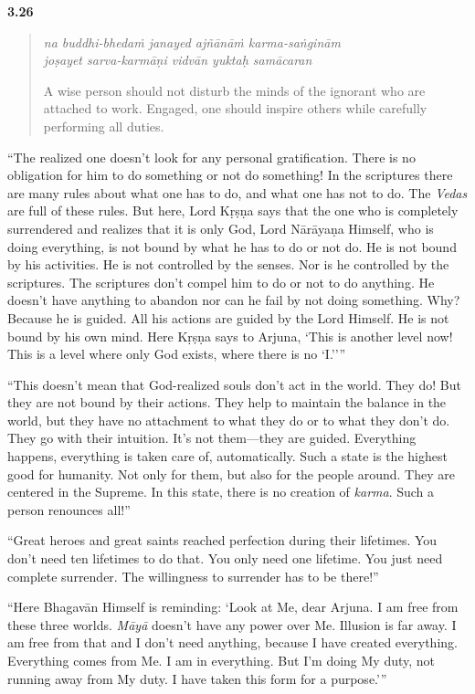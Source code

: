 \par\noindent\textbf{3.26}\par
\begin{verse}
\textit{na buddhi-bhedaṁ janayed ajñānāṁ karma-saṅginām} \\
\textit{joṣayet sarva-karmāṇi vidvān yuktaḥ samācaran}

\noindent A wise person should not disturb the minds of the ignorant who are attached to work. Engaged, one should inspire others while carefully performing all duties.
\end{verse}
\par


\enquote{The realized one doesn’t look for any personal gratification. There is no obligation for him to do something or not do something! In the scriptures there are many rules about what one has to do, and what one has not to do. The \textit{Vedas} are full of these rules. But here, Lord Kṛṣṇa says that the one who is completely surrendered and realizes that it is only God, Lord Nārāyaṇa Himself, who is doing everything, is not bound by what he has to do or not do. He is not bound by his activities. He is not controlled by the senses. Nor is he controlled by the scriptures. The scriptures don’t compel him to do or not to do anything. He doesn’t have anything to abandon nor can he fail by not doing something. Why? Because he is guided. All his actions are guided by the Lord Himself. He is not bound by his own mind. Here Kṛṣṇa says to Arjuna, \enquote{This is another level now! This is a level where only God exists, where there is no ‘I.’}}

\enquote{This doesn’t mean that God-realized souls don’t act in the world. They do! But they are not bound by their actions. They help to maintain the balance in the world, but they have no attachment to what they do or to what they don’t do. They go with their intuition. It’s not them---they are guided. Everything happens, everything is taken care of, automatically. Such a state is the highest good for humanity. Not only for them, but also for the people around. They are centered in the Supreme. In this state, there is no creation of \textit{karma}. Such a person renounces all!}


\enquote{Great heroes and great saints reached perfection during their lifetimes. You don’t need ten lifetimes to do that. You only need one lifetime. You just need complete surrender. The willingness to surrender has to be there!}

\enquote{Here Bhagavān Himself is reminding: \enquote{Look at Me, dear Arjuna. I am free from these three worlds. \textit{Māyā} doesn’t have any power over Me. Illusion is far away. I am free from that and I don’t need anything, because I have created everything. Everything comes from Me. I am in everything. But I’m doing My duty, not running away from My duty. I have taken this form for a purpose.}}

